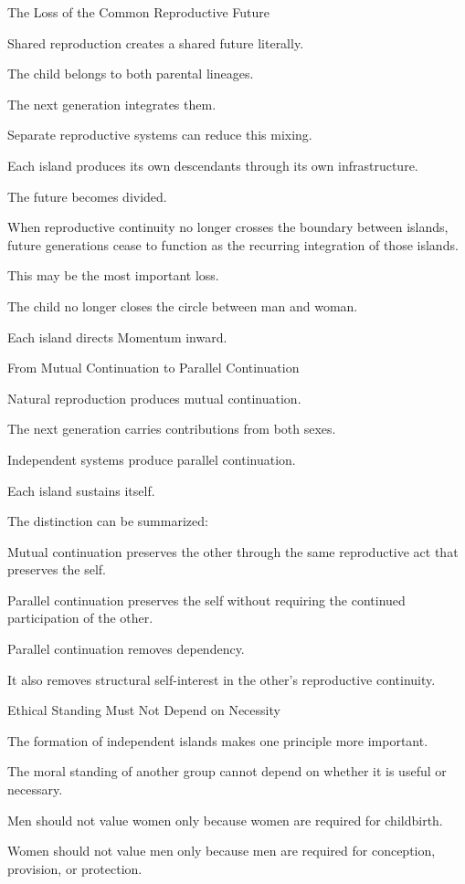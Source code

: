 The Loss of the Common Reproductive Future

Shared reproduction creates a shared future literally.

The child belongs to both parental lineages.

The next generation integrates them.

Separate reproductive systems can reduce this mixing.

Each island produces its own descendants through its own infrastructure.

The future becomes divided.

When reproductive continuity no longer crosses the boundary between islands, future generations cease to function as the recurring integration of those islands.

This may be the most important loss.

The child no longer closes the circle between man and woman.

Each island directs Momentum inward.

From Mutual Continuation to Parallel Continuation

Natural reproduction produces mutual continuation.

The next generation carries contributions from both sexes.

Independent systems produce parallel continuation.

Each island sustains itself.

The distinction can be summarized:

Mutual continuation preserves the other through the same reproductive act that preserves the self.

Parallel continuation preserves the self without requiring the continued participation of the other.

Parallel continuation removes dependency.

It also removes structural self-interest in the other’s reproductive continuity.

Ethical Standing Must Not Depend on Necessity

The formation of independent islands makes one principle more important.

The moral standing of another group cannot depend on whether it is useful or necessary.

Men should not value women only because women are required for childbirth.

Women should not value men only because men are required for conception, provision, or protection.

